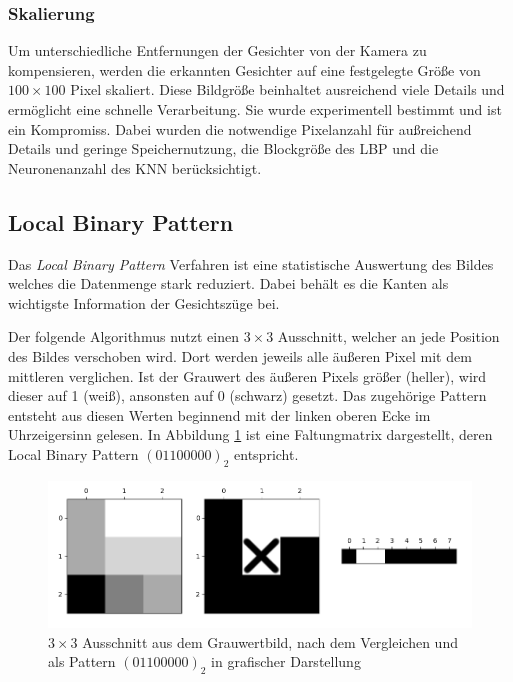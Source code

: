 \documentclass[12pt, a4paper]{article}
\begin{document}
\subsubsection{Skalierung}
Um unterschiedliche Entfernungen der Gesichter von der Kamera zu kompensieren, werden die erkannten Gesichter auf eine festgelegte Größe von \(100 \times 100\) Pixel skaliert. Diese Bildgröße beinhaltet ausreichend viele Details und ermöglicht eine schnelle Verarbeitung. Sie wurde experimentell bestimmt und ist ein Kompromiss. Dabei wurden die notwendige Pixelanzahl für außreichend Details und geringe Speichernutzung, die Blockgröße des LBP und die Neuronenanzahl des KNN berücksichtigt.

\subsection{Local Binary Pattern}
\label{sec:lbp}

Das \textit{Local Binary Pattern} Verfahren ist eine statistische Auswertung des Bildes welches die Datenmenge stark reduziert. Dabei behält es die Kanten als wichtigste Information der Gesichtszüge bei.

Der folgende Algorithmus nutzt einen \(3 \times 3\) Ausschnitt, welcher an jede Position des Bildes verschoben wird. Dort werden jeweils alle äußeren Pixel mit dem mittleren verglichen. Ist der Grauwert des äußeren Pixels größer (heller), wird dieser auf 1 (weiß), ansonsten auf 0 (schwarz) gesetzt. Das zugehörige Pattern entsteht aus diesen Werten beginnend mit der linken oberen Ecke im Uhrzeigersinn gelesen. In Abbildung \ref{fig:lbp_pattern} ist eine Faltungmatrix dargestellt, deren Local Binary Pattern \((01100000)_{2}\) entspricht.

\begin{figure}
	\includegraphics[width=\textwidth]{lbp_pattern}
	\caption{ \(3 \times 3\) Ausschnitt aus dem Grauwertbild, nach dem Vergleichen und als Pattern \((01100000)_{2}\) in grafischer Darstellung}
	\label{fig:lbp_pattern}
\end{figure}
\end{document}
